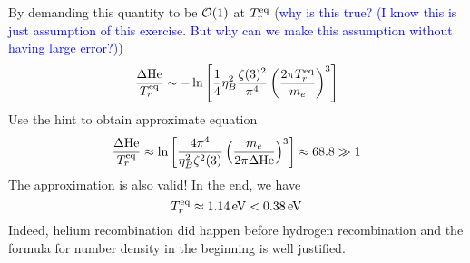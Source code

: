 \begin{enumerate}[label=(\alph*)]
      By demanding this quantity to be $\order{1}$ at $T^{\text{eq}}_r$ (\textcolor{blue}{why is this true? (I know this is just assumption of this exercise. But why can we make this assumption without having large error?)})
      \begin{equation*}
         \frac{\Delta \text{He}}{T_r^{\text{eq}}} \sim - \ln \left[ \frac{1}{4} \eta_B^2 \frac{\zeta(3)^2}{\pi^4} \left( \frac{2\pi T^{\text{eq}}_r}{m_e} \right)^3 \right] 
      \end{equation*}
      Use the hint to obtain approximate equation
      \begin{align}
         \frac{\Delta \text{He}}{T_r^{\text{eq}}} \approx \ln \left[ \frac{4 \pi^4}{\eta_B^2 \zeta^2(3)} \left( \frac{m_e}{2 \pi \Delta\text{He}} \right)^3 \right] \approx 68.8 \gg 1
      \end{align}
      The approximation is also valid! In the end, we have
      \begin{equation}
         T_r^\eq \approx \SI{1.14}{\eV} < \SI{0.38}{\eV}
      \end{equation}
      Indeed, helium recombination did happen before hydrogen recombination and the formula for number density in the beginning is well justified.
\end{enumerate}
